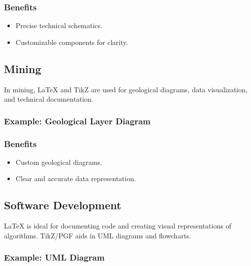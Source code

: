 \documentclass{article}
\begin{document}
\subsubsection*{Benefits}
\begin{itemize}
    \item Precise technical schematics.
    \item Customizable components for clarity.
\end{itemize}

\subsection{Mining}
In mining, LaTeX and TikZ are used for geological diagrams, data visualization, and technical documentation.

\subsubsection*{Example: Geological Layer Diagram}

\subsubsection*{Benefits}
\begin{itemize}
    \item Custom geological diagrams.
    \item Clear and accurate data representation.
\end{itemize}

\subsection{Software Development}
LaTeX is ideal for documenting code and creating visual representations of algorithms. TikZ/PGF aids in UML diagrams and flowcharts.

\subsubsection*{Example: UML Diagram}
\end{document}
